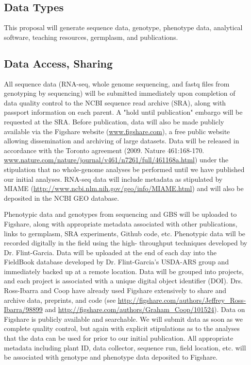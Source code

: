 \subsection*{Data Types}

This proposal will generate sequence data, genotype, phenotype data, analytical software, teaching resources, germplasm, and publications.

\subsection*{Data Access, Sharing}

All sequence data (RNA-seq, whole genome sequencing, and fastq files from genotyping by sequencing) will be submitted immediately upon completion of data quality control to the NCBI sequence read archive (SRA), along with passport information on each parent. A "hold until publication" embargo will be requested at the SRA. Before publication, data will also be made publicly available via the Figshare website (\url{www.figshare.com}), a free public website allowing dissemination and archiving of large datasets. Data will be released in accordance with the Toronto agreement (2009. Nature 461:168-170. \url{www.nature.com/nature/journal/v461/n7261/full/461168a.html}) under the stipulation that no whole-genome analyses be performed until we have published our initial analyses. RNA-seq data will include metadata as stipulated by MIAME (\url{http://www.ncbi.nlm.nih.gov/geo/info/MIAME.html}) and will also be deposited in the NCBI GEO database.

Phenotypic data and genotypes from sequencing and GBS will be uploaded to Figshare, along with appropriate metadata associated with other publications, links to germplasm, SRA experiments, Github code, etc.  Phenotypic data will be recorded digitally in the field using the high- throughput techniques developed by Dr. Flint-Garcia. Data will be uploaded at the end of each day into the FieldBook database developed by Dr. Flint-Garcia’s USDA-ARS group and immediately backed up at a remote location. Data will be grouped into projects, and each project is associated with a unique digital object identifier (DOI). Drs. Ross-Ibarra and Coop have already used Figshare extensively to share and archive data, preprints, and code (see \url{http://figshare.com/authors/Jeffrey_Ross-Ibarra/98899}  and \url{http://figshare.com/authors/Graham_Coop/101524}). Data on Figshare is publicly available and searchable.  We will submit data as soon as we complete quality control, but again with explicit stipulations as to the analyses that the data can be used for prior to our initial publication. All appropriate metadata including plant ID, data collector, sequence run, field location, etc. will be associated with genotype and phenotype data deposited to Figshare. 

